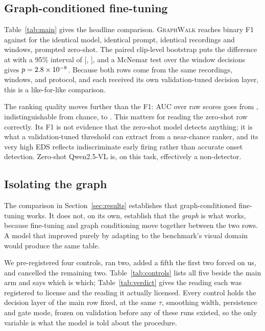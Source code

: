 \documentclass[10pt,twocolumn]{article}
\newcommand{\ourmodel}{\textsc{GraphWalk}}
\begin{document}
\subsection{Graph-conditioned fine-tuning}

Table~\ref{tab:main} gives the headline comparison. \ourmodel{} reaches \resF{}
binary F1 against \resZS{} for the identical model, identical prompt, identical
recordings and windows, prompted zero-shot. The paired clip-level bootstrap puts
the difference at \resDelta{} with a 95\% interval of [\resDeltaLo{},
\resDeltaHi{}], and a McNemar test over the \resWindows{} window decisions gives
$p = 2.8\times 10^{-8}$. Because both rows come from the same recordings, windows, and
protocol, and each received its own validation-tuned decision layer, this is a
like-for-like comparison.

The ranking quality moves further than the F1: AUC over raw scores goes from
\resAUCzs{}, indistinguishable from chance, to \resAUC{}. This matters for
reading the zero-shot row correctly. Its \resZS{} F1 is not evidence that the
zero-shot model detects anything; it is what a validation-tuned threshold can
extract from a near-chance ranker, and its very high EDS reflects indiscriminate
early firing rather than accurate onset detection. Zero-shot Qwen2.5-VL is, on
this task, effectively a non-detector.

\subsection{Isolating the graph}
\label{sec:graphablation}

The comparison in Section~\ref{sec:results} establishes that graph-conditioned
fine-tuning works. It does not, on its own, establish that the \emph{graph} is
what works, because fine-tuning and graph conditioning move together between the
two rows. A model that improved purely by adapting to the benchmark's visual
domain would produce the same table.

We pre-registered four controls, ran two, added a fifth the first two forced on
us, and cancelled the remaining two. Table~\ref{tab:controls} lists all five
beside the main arm and says which is which; Table~\ref{tab:verdict} gives the reading each was
registered to license and the reading it actually licensed. Every control holds
the decision layer of the main row fixed, at the same $\tau$, smoothing width,
persistence and gate mode, frozen on validation before any of these runs
existed, so the only variable is what the model is told about the procedure.
\end{document}
